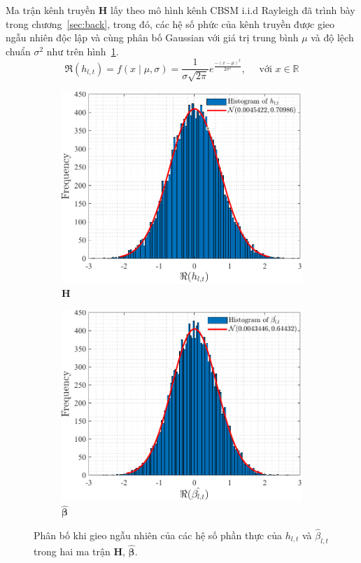 Ma trận kênh truyền $\mathbf{H}$ lấy theo mô hình kênh CBSM i.i.d Rayleigh đã trình bày trong chương~\ref{sec:back}, trong đó, các hệ số phức của kênh truyền được gieo ngẫu nhiên độc lập và cùng phân bố Gaussian với giá trị trung bình $\mu$ và độ lệch chuẩn $\sigma^2$ như trên hình~\ref{fig:ray_H}.
\begin{equation}
\Re(h_{l, t})=f(x \mid \mu, \sigma)=\frac{1}{\sigma \sqrt{2 \pi}} e^{\frac{-(x-\mu)^2}{2 \sigma^2}}, \quad \text { với } x \in \mathbb{R}
\end{equation}
\begin{figure}
    \centering
    \begin{subfigure}{.48\linewidth}
        \includegraphics[width=\linewidth]{figures/H.pdf}
        \caption{$\mathbf{H}$}
        \label{fig:ray_H}
    \end{subfigure}
    \hfill
    \begin{subfigure}{.48\linewidth}
        \includegraphics[width=\linewidth]{figures/Beta.pdf}
        \caption{$\hat{\boldsymbol{\beta}}$}
        \label{fig:ray_Beta}
    \end{subfigure}
    \caption{Phân bố khi gieo ngẫu nhiên của các hệ số phần thực của $h_{l, t}$ và $ \hat{\beta}_{l, t}$ trong hai ma trận $\mathbf{H}$, $\hat{\boldsymbol{\beta}}$.}
    \label{fig:ray}
\end{figure}

